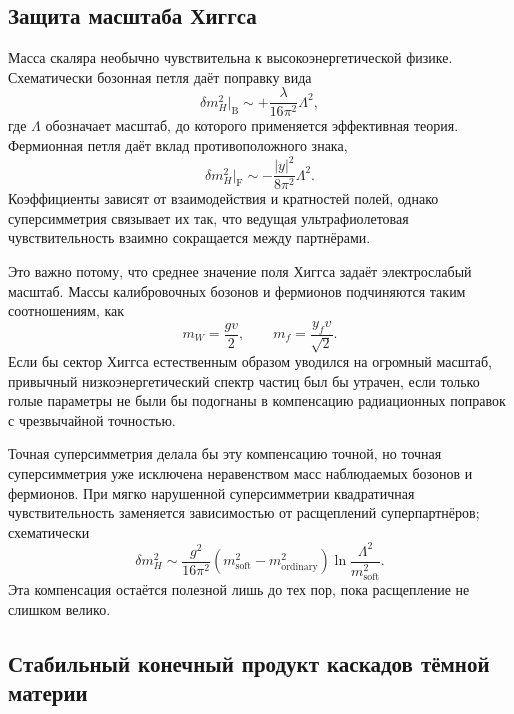 \subsection{Защита масштаба Хиггса}

Масса скаляра необычно чувствительна к высокоэнергетической физике. Схематически бозонная петля даёт поправку вида
\begin{equation}
\delta m_H^2\big|_{\mathrm B}
\sim +\frac{\lambda}{16\pi^2}\Lambda^2,
\end{equation}
где \(\Lambda\) обозначает масштаб, до которого применяется эффективная теория. Фермионная петля даёт вклад противоположного знака,
\begin{equation}
\delta m_H^2\big|_{\mathrm F}
\sim -\frac{|y|^2}{8\pi^2}\Lambda^2.
\end{equation}
Коэффициенты зависят от взаимодействия и кратностей полей, однако суперсимметрия связывает их так, что ведущая ультрафиолетовая чувствительность взаимно сокращается между партнёрами.

Это важно потому, что среднее значение поля Хиггса задаёт электрослабый масштаб. Массы калибровочных бозонов и фермионов подчиняются таким соотношениям, как
\begin{equation}
m_W=\frac{gv}{2},
\qquad
m_f=\frac{y_fv}{\sqrt2}.
\end{equation}
Если бы сектор Хиггса естественным образом уводился на огромный масштаб, привычный низкоэнергетический спектр частиц был бы утрачен, если только голые параметры не были бы подогнаны в компенсацию радиационных поправок с чрезвычайной точностью.

Точная суперсимметрия делала бы эту компенсацию точной, но точная суперсимметрия уже исключена неравенством масс наблюдаемых бозонов и фермионов. При мягко нарушенной суперсимметрии квадратичная чувствительность заменяется зависимостью от расщеплений суперпартнёров; схематически
\begin{equation}
\delta m_H^2
\sim
\frac{g^2}{16\pi^2}
\left(m_{\mathrm{soft}}^2-m_{\mathrm{ordinary}}^2\right)
\ln\frac{\Lambda^2}{m_{\mathrm{soft}}^2}.
\end{equation}
Эта компенсация остаётся полезной лишь до тех пор, пока расщепление не слишком велико.

\subsection{Стабильный конечный продукт каскадов тёмной материи}

